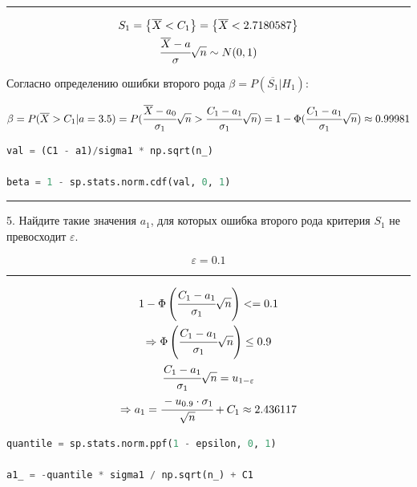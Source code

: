 \documentclass[a4paper, 14pt]{extarticle}
\begin{document}
\rule{\linewidth}{0.1mm}

\begin{gather*}
    S_1 = \left\{ \overline{X} < C_1 \right\} = \left\{ \overline{X} < 2.7180587 \right\} \\
    \cfrac{\overline{X} - a}{\sigma} \sqrt{n} \sim N(0, 1)
\end{gather*}

Согласно определению ошибки второго рода $\beta = P(\overline{S_1}|H_1)$:

\begin{equation*}
    \beta = P(\overline{X} > C_1 | a = 3.5) = P(\cfrac{\overline{X} - a_0}{\sigma_1}\sqrt{n} > 
    \cfrac{C_1 - a_1}{\sigma_1}\sqrt{n}) = 1 - \Phi(\cfrac{C_1 - a_1}{\sigma_1}\sqrt{n}) 
    \approx 0.99981
\end{equation*}

\begin{center}
    \begin{lstlisting}[language=Python]
val = (C1 - a1)/sigma1 * np.sqrt(n_)

beta = 1 - sp.stats.norm.cdf(val, 0, 1)
    \end{lstlisting}
\end{center}

\rule{\linewidth}{0.1mm}

5. Найдите такие значения $a_1$, для которых ошибка второго рода критерия $S_1$ не 
превосходит $\varepsilon$.

\begin{equation*}
    \varepsilon = 0.1
\end{equation*}

\rule{\linewidth}{0.1mm}

\begin{gather*}
    1 - \Phi\left(\cfrac{C_1 - a_1}{\sigma_1} \sqrt{n}\right) <= 0.1 \\
    \Rightarrow \Phi \left( \cfrac{C_1 - a_1}{\sigma_1} \sqrt{n} \right) \leq 0.9 \\
    \cfrac{C_1 - a_1}{\sigma_1} \sqrt{n} = u_{1 - \varepsilon} \\
    \Rightarrow a_1 = \cfrac{-u_{0.9} \cdot \sigma_1}{\sqrt{n}} + C_1 \approx 2.436117
\end{gather*}

\begin{center}
    \begin{lstlisting}[language=Python]
quantile = sp.stats.norm.ppf(1 - epsilon, 0, 1)

a1_ = -quantile * sigma1 / np.sqrt(n_) + C1
    \end{lstlisting}
\end{center}
\end{document}
